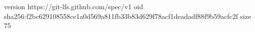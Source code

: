 version https://git-lfs.github.com/spec/v1
oid sha256:f2bc629108558ce1a0d569a811fb33b83d629f78acf1deadadf88f9b59acfc2f
size 75
